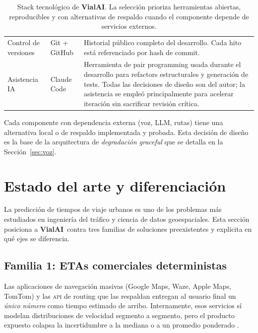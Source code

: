 \documentclass[11pt,a4paper]{article}
\newcommand{\VialAI}{\textbf{\textcolor{vialTeal}{Vial}\textcolor{vialAmber}{AI}}}
\begin{document}
\begin{table}[H]
\begin{tabularx}{\linewidth}{@{}l l X@{}}
Control de versiones & Git + GitHub & Historial público completo
del desarrollo. Cada hito está referenciado por hash de commit.\\
Asistencia IA & Claude Code & Herramienta de pair programming
usada durante el desarrollo para refactors estructurales y
generación de tests. Todas las decisiones de diseño son del autor;
la asistencia se empleó principalmente para acelerar iteración sin
sacrificar revisión crítica.\\
\bottomrule
\end{tabularx}
\caption{Stack tecnológico de \VialAI. La selección prioriza
herramientas abiertas, reproducibles y con alternativas de
respaldo cuando el componente depende de servicios externos.}
\label{tab:stack}
\end{table}

\begin{tipbox}
Cada componente con dependencia externa (voz, LLM, rutas) tiene
una alternativa local o de respaldo implementada y probada. Esta
decisión de diseño es la base de la arquitectura de
\emph{degradación graceful} que se detalla en la
Sección~\ref{sec:voz}.
\end{tipbox}

\section{Estado del arte y diferenciación}
\label{sec:arte}

La predicción de tiempos de viaje urbanos es uno de los problemas
más estudiados en ingeniería del tráfico y ciencia de datos
geoespaciales. Esta sección posiciona a \VialAI\ contra tres
familias de soluciones preexistentes y explicita en qué ejes se
diferencia.

\subsection{Familia 1: ETAs comerciales deterministas}

Las aplicaciones de navegación masivas (Google Maps, Waze, Apple
Maps, TomTom) y las \textsc{api} de routing que las respaldan
entregan al usuario final un \emph{único número} como tiempo
estimado de arribo. Internamente, esos servicios sí modelan
distribuciones de velocidad segmento a segmento, pero el producto
expuesto colapsa la incertidumbre a la mediana o a un promedio
ponderado \citep{google2023eta,tomtom2024routing}.
\end{document}
